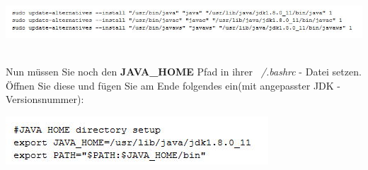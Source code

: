 \documentclass[a4paper, 12pt]{scrreprt}
\begin{document}
\begin{center}
\includegraphics[width=1.1\linewidth]{Grafiken/Liunux_befehle}
\end{center}
\newpage
\ \\
Nun müssen Sie noch den \textbf{JAVA\_HOME} Pfad in ihrer {\it ~/.bashrc} - Datei setzen.\\
Öffnen Sie diese und fügen Sie am Ende folgendes ein(mit angepasster JDK - Versionsnummer):
\begin{center}
\includegraphics[width=0.7\linewidth]{Grafiken/JAVAHome}
\end{center}
\end{document}
